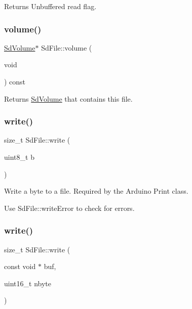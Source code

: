 \begin{DoxyReturn}{Returns}
Unbuffered read flag. 
\end{DoxyReturn}
\mbox{\label{class_sd_file_a85578a1addda7cdba336a5b10deafcf5}} 
\subsubsection{\texorpdfstring{volume()}{volume()}}
{\footnotesize\ttfamily \hyperlink{class_sd_volume}{Sd\+Volume}$\ast$ Sd\+File\+::volume (\begin{DoxyParamCaption}\item[{void}]{ }\end{DoxyParamCaption}) const\hspace{0.3cm}{\ttfamily [inline]}}

\begin{DoxyReturn}{Returns}
\hyperlink{class_sd_volume}{Sd\+Volume} that contains this file. 
\end{DoxyReturn}
\mbox{\label{class_sd_file_a67267a4b63d03a16e099195935613006}} 
\subsubsection{\texorpdfstring{write()}{write()}\hspace{0.1cm}{\footnotesize\ttfamily [1/3]}}
{\footnotesize\ttfamily size\+\_\+t Sd\+File\+::write (\begin{DoxyParamCaption}\item[{uint8\+\_\+t}]{b }\end{DoxyParamCaption})}

Write a byte to a file. Required by the Arduino Print class.

Use Sd\+File\+::write\+Error to check for errors. \mbox{\label{class_sd_file_a94d4541fda63b5390c8e97ebe815115a}} 
\subsubsection{\texorpdfstring{write()}{write()}\hspace{0.1cm}{\footnotesize\ttfamily [2/3]}}
{\footnotesize\ttfamily size\+\_\+t Sd\+File\+::write (\begin{DoxyParamCaption}\item[{const void $\ast$}]{buf,  }\item[{uint16\+\_\+t}]{nbyte }\end{DoxyParamCaption})}

